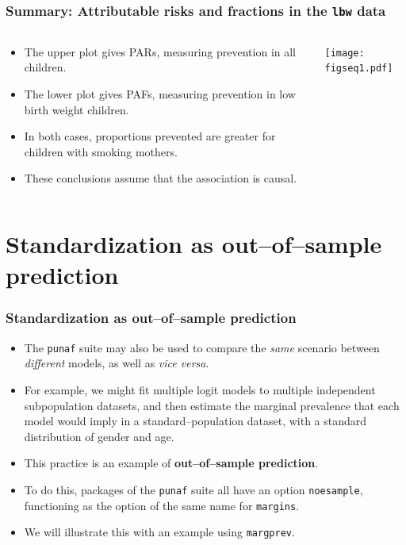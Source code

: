 \documentclass[11pt]{beamer}
\begin{document}
\begin{frame}
\frametitle{Summary: Attributable risks and fractions in the \texttt{lbw} data}

\begin{columns}[t]
\begin{column}{48mm}
\begin{itemize}
\item<2-> The upper plot gives PARs, measuring prevention in all children.
\item<3-> The lower plot gives PAFs, measuring prevention in low birth weight children.
\item<4-> In both cases, proportions prevented are greater for children with smoking mothers.
\item<5-> These conclusions assume that the association is causal.
\end{itemize}
\end{column}
\begin{column}[T]{80mm}
\texttt{[image: figseq1.pdf]}
\end{column}
\end{columns}

\end{frame}

\section{Standardization as out--of--sample prediction}

\begin{frame}
\frametitle{Standardization as out--of--sample prediction}

\begin{itemize}

\item<2-> The \texttt{punaf} suite may also be used to compare the \textit{same} scenario between \textit{different} models,
as well as \textit{vice versa}.

\item<3-> For example, we might fit multiple logit models to multiple independent subpopulation datasets,
and then estimate the marginal prevalence that each model would imply in a standard--population dataset,
with a standard distribution of gender and age.

\item<4-> This practice is an example of \textbf{out--of--sample prediction}.

\item<5-> To do this, packages of the \texttt{punaf} suite all have an option \texttt{noesample},
functioning as the option of the same name for \texttt{margins}.

\item<6-> We will illustrate this with an example using \texttt{margprev}.

\end{itemize}

\end{frame}
\end{document}

